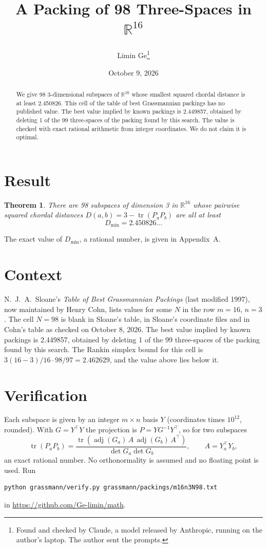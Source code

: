 \documentclass[11pt,a4paper]{article}
\title{A Packing of 98 Three-Spaces in $\mathbb{R}^{16}$}
\author{Limin Ge\thanks{Found and checked by Claude, a model released by Anthropic, running on the author's laptop. The author sent the prompts.}}
\date{October 9, 2026}
\newtheorem*{theorem}{Theorem}
\begin{document}
\maketitle
\begin{abstract}
We give 98 3-dimensional subspaces of $\mathbb{R}^{16}$ whose smallest squared chordal distance is at least 2.450826. This cell of the table of best Grassmannian packings has no published value. The best value implied by known packings is 2.449857, obtained by deleting 1 of the 99 three-spaces of the packing found by this search. The value is checked with exact rational arithmetic from integer coordinates. We do not claim it is optimal.
\end{abstract}

\section{Result}
\begin{theorem}
There are 98 subspaces of dimension 3 in $\mathbb{R}^{16}$ whose pairwise squared chordal distances $D(a,b) = 3 - \operatorname{tr}(P_aP_b)$ are all at least
\[ D_{\min} = 2.450826\ldots \]
\end{theorem}
The exact value of $D_{\min}$, a rational number, is given in Appendix~A.


\section{Context}
N.~J.~A.~Sloane's \emph{Table of Best Grassmannian Packings} (last modified 1997), now maintained by Henry Cohn, lists values for some $N$ in the row $m=16$, $n=3$. The cell $N=98$ is blank in Sloane's table, in Sloane's coordinate files and in Cohn's table as checked on October 8, 2026. The best value implied by known packings is 2.449857, obtained by deleting 1 of the 99 three-spaces of the packing found by this search. The Rankin simplex bound for this cell is $3(16-3)/16\cdot 98/97 = 2.462629$, and the value above lies below it.


\section{Verification}
Each subspace is given by an integer $m\times n$ basis $Y$ (coordinates times $10^{12}$, rounded). With $G=Y^\top Y$ the projection is $P=YG^{-1}Y^\top$, so for two subspaces
\[ \operatorname{tr}(P_aP_b)=\frac{\operatorname{tr}(\operatorname{adj}(G_a)\,A\,\operatorname{adj}(G_b)\,A^\top)}{\det G_a\det G_b},\qquad A=Y_a^\top Y_b, \]
an exact rational number. No orthonormality is assumed and no floating point is used. Run
\begin{verbatim}
python grassmann/verify.py grassmann/packings/m16n3N98.txt
\end{verbatim}
in \url{https://github.com/Ge-limin/math}.
\end{document}

